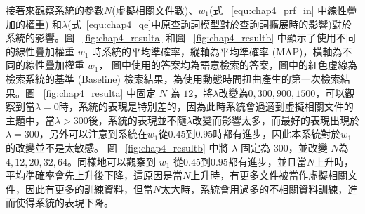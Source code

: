 \begin{table}[htbp]
  \centering
    \caption{系統找回與查詢詞語意相關的文件數量，包括含查詢詞與不含查詢詞的文件數。}
    \label{table:chap4_result2}%
\end{table}%

接著來觀察系統的參數$N$(虛擬相關文件數)、$w_1$(式 ~\ref{equ:chap4_prf_in} 中線性疊加的權重) 和$\lambda$(式~\ref{equ:chap4_qe}中原查詢詞模型對於查詢詞擴展時的影響)對於系統的影響。圖 ~\ref{fig:chap4_resulta} 和圖 ~\ref{fig:chap4_resultb} 中顯示了使用不同的線性疊加權重 $w_1$ 時系統的平均準確率，縱軸為平均準確率 (MAP)，橫軸為不同的線性疊加權重 $w_1$， 圖中使用的答案均為語意檢索的答案，圖中的紅色虛線為檢索系統的基準 (Baseline) 檢索結果，為使用動態時間扭曲產生的第一次檢索結果。圖 ~\ref{fig:chap4_resulta} 中固定 $N$ 為 $12$，將$\lambda$改變為$0,
300, 900, 1500$，可以觀察到當$\lambda = 0$時，系統的表現是特別差的，因為此時系統會過適到虛擬相關文件的主題中，當$\lambda>300$後，系統的表現並不隨$\lambda$改變而影響太多，而最好的表現出現於$\lambda=300$，另外可以注意到系統在$w_1$從$0.45$到$0.95$時都有進步，因此本系統對於$w_1$的改變並不是太敏感。
圖 ~\ref{fig:chap4_resultb} 中將 $\lambda$ 固定為 $300$，並改變 $N$為 $4, 12, 20, 32, 64$。同樣地可以觀察到 $w_1$ 從$0.45$到$0.95$都有進步，並且當$N$上升時，平均準確率會先上升後下降，這原因是當$N$上升時，有更多文件被當作虛擬相關文件，因此有更多的訓練資料，但當$N$太大時，系統會用過多的不相關資料訓練，進而使得系統的表現下降。


